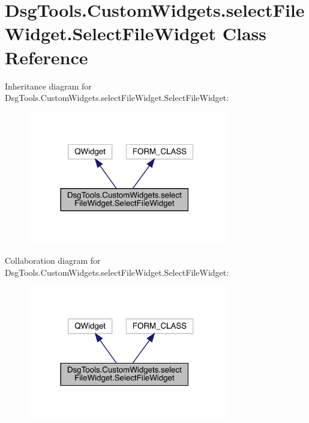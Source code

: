 \hypertarget{class_dsg_tools_1_1_custom_widgets_1_1select_file_widget_1_1_select_file_widget}{}\section{Dsg\+Tools.\+Custom\+Widgets.\+select\+File\+Widget.\+Select\+File\+Widget Class Reference}
\label{class_dsg_tools_1_1_custom_widgets_1_1select_file_widget_1_1_select_file_widget}


Inheritance diagram for Dsg\+Tools.\+Custom\+Widgets.\+select\+File\+Widget.\+Select\+File\+Widget\+:
\nopagebreak
\begin{figure}[H]
\begin{center}
\leavevmode
\includegraphics[width=246pt]{class_dsg_tools_1_1_custom_widgets_1_1select_file_widget_1_1_select_file_widget__inherit__graph}
\end{center}
\end{figure}


Collaboration diagram for Dsg\+Tools.\+Custom\+Widgets.\+select\+File\+Widget.\+Select\+File\+Widget\+:
\nopagebreak
\begin{figure}[H]
\begin{center}
\leavevmode
\includegraphics[width=246pt]{class_dsg_tools_1_1_custom_widgets_1_1select_file_widget_1_1_select_file_widget__coll__graph}
\end{center}
\end{figure}
